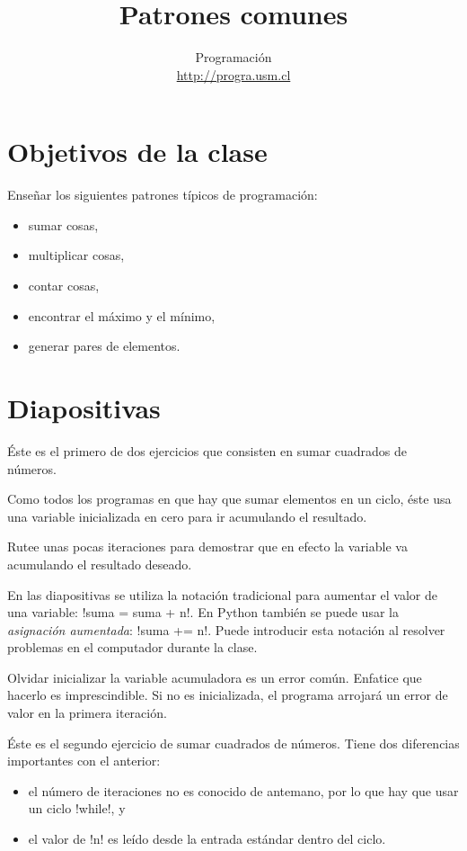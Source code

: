 \documentclass[10pt]{article}
\title{Patrones comunes}
\author{Programación \\ \url{http://progra.usm.cl}}
\date{}
\begin{document}
  \maketitle

  \section*{Objetivos de la clase}
  Enseñar los siguientes patrones típicos de programación:
  \begin{itemize}
    \item sumar cosas,
    \item multiplicar cosas,
    \item contar cosas,
    \item encontrar el máximo y el mínimo,
    \item generar pares de elementos.
  \end{itemize}

  \section*{Diapositivas}


  Éste es el primero de dos ejercicios
  que consisten en sumar cuadrados de números.

  Como todos los programas en que hay que sumar elementos en un ciclo,
  éste usa una variable inicializada en cero para ir acumulando el resultado.

  Rutee unas pocas iteraciones para demostrar que en efecto
  la variable va acumulando el resultado deseado.

  En las diapositivas se utiliza la notación tradicional
  para aumentar el valor de una variable:
  \li!suma = suma + n!.
  En Python también se puede usar la \emph{asignación aumentada}:
  \li!suma += n!.
  Puede introducir esta notación al resolver problemas en el computador durante la clase.

  Olvidar inicializar la variable acumuladora es un error común.
  Enfatice que hacerlo es imprescindible.
  Si no es inicializada, el programa arrojará un error de valor en la primera iteración.


  Éste es el segundo ejercicio de sumar cuadrados de números.
  Tiene dos diferencias importantes con el anterior:
  \begin{itemize}
    \item el número de iteraciones no es conocido de antemano,
      por lo que hay que usar un ciclo \li!while!, y
    \item el valor de \li!n! es leído desde la entrada estándar
      dentro del ciclo.
  \end{itemize}
  
\end{document}
